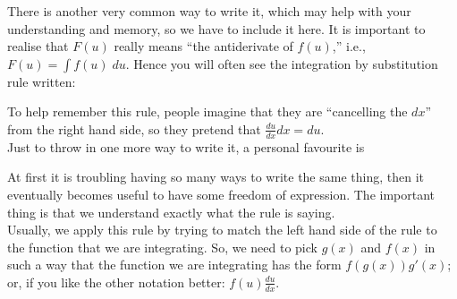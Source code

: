   	\bigskip
	
	\hfil{}
	\bigskip

\noindent There is another very common way to write it, which may help with your understanding and memory, so we have to include it here. It is important to realise that $F(u)$ really means ``the antiderivate of $f(u)$,'' i.e., $F(u) = \int f(u) \; du$. Hence you will often see the integration by substitution rule written:

  	\bigskip
	
	\hfil{}
	\bigskip

\noindent To help remember this rule, people imagine that they are ``cancelling the $dx$'' from the right hand side, so they pretend that $\displaystyle{\frac{du}{dx}dx = du}.$ \\

\noindent Just to throw in one more way to write it, a personal favourite is

  	\bigskip
	
	\hfil{}
	\bigskip

\noindent At first it is troubling having so many ways to write the same thing, then it eventually becomes useful to have some freedom of expression. The important thing is that we understand exactly what the rule is saying. \\

\noindent Usually, we apply this rule by trying to match the left hand side of the rule to the function that we are integrating. So, we need to pick $g(x)$ and $f(x)$ in such a way that the function we are integrating has the form $f(g(x))g'(x)$; or, if you like the other notation better: $f(u)\frac{du}{dx}.$ \\


